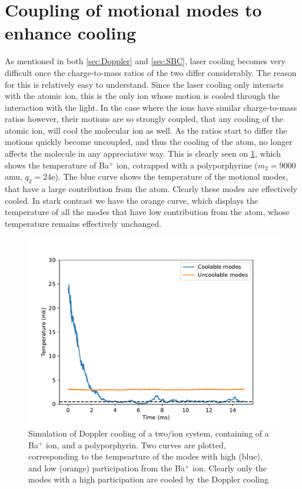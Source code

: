 \section{Coupling of motional modes to enhance cooling}
\label{sec:Coupling}
As mentioned in both \cref{sec:Doppler} and \cref{sec:SBC}, laser cooling becomes very difficult once the charge-to-mass ratios of the two differ considerably. The reason for this is relatively easy to understand.
Since the laser cooling only interacts with the atomic ion, this is the only ion whose motion is cooled through the interaction with the light. In the case where the ions have similar charge-to-mass ratios however, their motions are so strongly coupled, that any cooling of the atomic ion, will cool the molecular ion as well.
As the ratios start to differ the motions quickly become uncoupled, and thus the cooling of the atom, no longer affects the molecule in any appreciative way. This is clearly seen on \cref{fig:WCMSCM}, which shows the temperature of Ba$^+$ ion, cotrapped with a polyporphyrine ($m_2 = 9000$ amu, $q_2 = 24$e). The blue curve shows the temperature of the motional modes, that have a large contribution from the atom. Clearly these modes are effectively cooled. In stark contrast we have the orange curve, which displays the temperature of all the modes that have low contribution from the atom, whose temperature remains effectively unchanged.

\begin{figure}
    \centering
    \includegraphics[width = \textwidth]{main/WCM_SCM_Temp.pdf}
    \caption{Simulation of Doppler cooling of a two/ion system, containing of a Ba$^+$ ion, and a polyporphyrin. Two curves are plotted, corresponding to the tempearture of the modes with high (blue), and low (orange) participation from the Ba$^+$ ion. Clearly only the modes with a high participation are cooled by the Doppler cooling}
    \label{fig:WCMSCM}
\end{figure}


